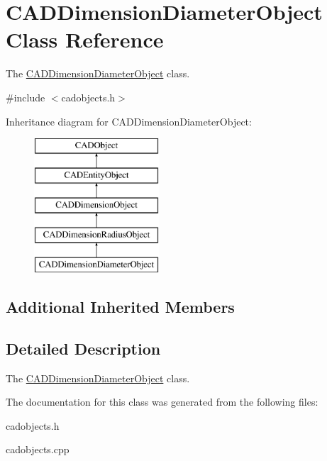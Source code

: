 \hypertarget{class_c_a_d_dimension_diameter_object}{}\section{C\+A\+D\+Dimension\+Diameter\+Object Class Reference}
\label{class_c_a_d_dimension_diameter_object}


The \hyperlink{class_c_a_d_dimension_diameter_object}{C\+A\+D\+Dimension\+Diameter\+Object} class.  




{\ttfamily \#include $<$cadobjects.\+h$>$}

Inheritance diagram for C\+A\+D\+Dimension\+Diameter\+Object\+:\begin{figure}[H]
\begin{center}
\leavevmode
\includegraphics[height=5.000000cm]{class_c_a_d_dimension_diameter_object}
\end{center}
\end{figure}
\subsection*{Additional Inherited Members}


\subsection{Detailed Description}
The \hyperlink{class_c_a_d_dimension_diameter_object}{C\+A\+D\+Dimension\+Diameter\+Object} class. 

The documentation for this class was generated from the following files\+:\begin{DoxyCompactItemize}
\item 
cadobjects.\+h\item 
cadobjects.\+cpp\end{DoxyCompactItemize}
